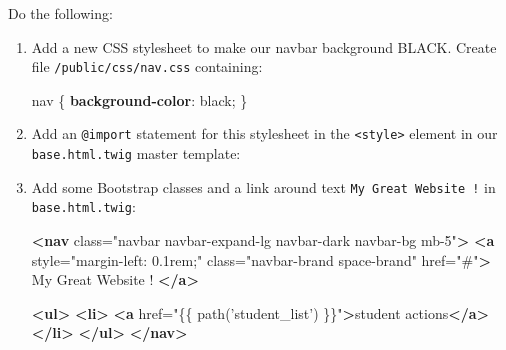 \documentclass[a4paperpaper,openright]{book}
\newenvironment{Shaded}{}{}
\newcommand{\ConstantTok}[1]{\textcolor[rgb]{0.53,0.00,0.00}{#1}}
\newcommand{\DataTypeTok}[1]{\textcolor[rgb]{0.56,0.13,0.00}{#1}}
\newcommand{\ImportTok}[1]{#1}
\newcommand{\KeywordTok}[1]{\textcolor[rgb]{0.00,0.44,0.13}{\textbf{#1}}}
\newcommand{\NormalTok}[1]{#1}
\newcommand{\OperatorTok}[1]{\textcolor[rgb]{0.40,0.40,0.40}{#1}}
\newcommand{\OtherTok}[1]{\textcolor[rgb]{0.00,0.44,0.13}{#1}}
\newcommand{\StringTok}[1]{\textcolor[rgb]{0.25,0.44,0.63}{#1}}
\begin{document}
Do the following:

\begin{enumerate}
\def\labelenumi{\arabic{enumi}.}
\item
  Add a new CSS stylesheet to make our navbar background BLACK. Create
  file \texttt{/public/css/nav.css} containing:

\begin{Shaded}
\begin{Highlighting}[]
\NormalTok{   nav \{}
       \KeywordTok{background-color}\NormalTok{: }\ConstantTok{black}\OperatorTok{;}
\NormalTok{   \}}
\end{Highlighting}
\end{Shaded}
\item
  Add an \texttt{@import} statement for this stylesheet in the
  \texttt{\textless{}style\textgreater{}} element in our
  \texttt{base.html.twig} master template:

\begin{Shaded}
\end{Shaded}
\item
  Add some Bootstrap classes and a link around text
  \texttt{My\ Great\ Website\ !} in \texttt{base.html.twig}:

\begin{Shaded}
\begin{Highlighting}[]
       \KeywordTok{<nav}\OtherTok{ class=}\StringTok{"navbar navbar-expand-lg navbar-dark navbar-bg mb-5"}\KeywordTok{>}
           \KeywordTok{<a}\OtherTok{ style=}\StringTok{"margin-left: 0.1rem;"}\OtherTok{ class=}\StringTok{"navbar-brand space-brand"}\OtherTok{ href=}\StringTok{"#"}\KeywordTok{>}
\NormalTok{               My Great Website !}
           \KeywordTok{</a>}

           \KeywordTok{<ul>}
               \KeywordTok{<li>}
                   \KeywordTok{<a}\OtherTok{ href=}\StringTok{"\{\{ path('student_list') \}\}"}\KeywordTok{>}\NormalTok{student actions}\KeywordTok{</a>}
               \KeywordTok{</li>}
           \KeywordTok{</ul>}
       \KeywordTok{</nav>}
\end{Highlighting}
\end{Shaded}
\end{enumerate}
\end{document}
